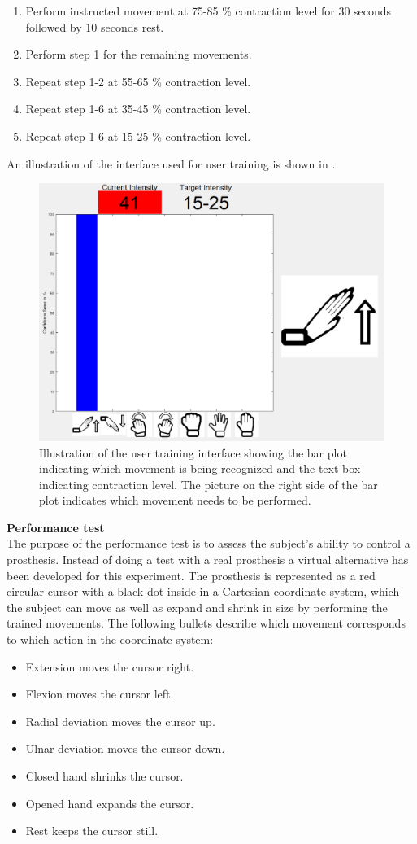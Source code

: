 \begin{enumerate}
	\item Perform instructed movement at 75-85 \% contraction level for 30 seconds followed by 10 seconds rest.
	\item Perform step 1 for the remaining movements.
	\item Repeat step 1-2 at 55-65 \% contraction level.
	\item Repeat step 1-6 at 35-45 \% contraction level.
	\item Repeat step 1-6 at 15-25 \% contraction level.
\end{enumerate} 

An illustration of the interface used for user training is shown in .

\begin{figure}[H]                 
	\includegraphics[width=.6\textwidth]{figures/xBackground/usertraincontrolGUI}  
	\caption{Illustration of the user training interface showing the bar plot indicating which movement is being recognized and the text box indicating contraction level. The picture on the right side of the bar plot indicates which movement needs to be performed.}
	\label{fig:usertraincontrolGUI} 
\end{figure}

\textbf{Performance test} \\
The purpose of the performance test is to assess the subject's ability to control a prosthesis. Instead of doing a test with a real prosthesis a virtual alternative has been developed for this experiment. The prosthesis is represented as a red circular cursor with a black dot inside in a Cartesian coordinate system, which the subject can move as well as expand and shrink in size by performing the trained movements. The following bullets describe which movement corresponds to which action in the coordinate system:

\begin{itemize}
	\item Extension moves the cursor right.
	\item Flexion moves the cursor left.
	\item Radial deviation moves the cursor up.
	\item Ulnar deviation moves the cursor down.
	\item Closed hand shrinks the cursor.
	\item Opened hand expands the cursor.
	\item Rest keeps the cursor still.
\end{itemize}

